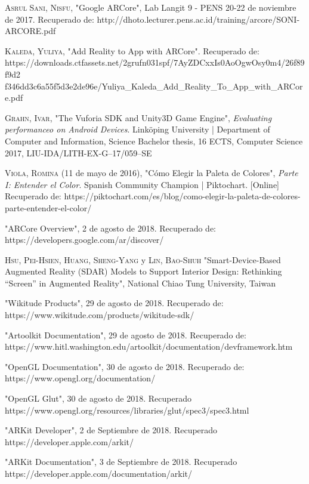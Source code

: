\begin{thebibliography}{X}
	 \textsc{Asrul Sani, Nisfu}, "Google ARCore", Lab Langit 9 - PENS 20-22 de noviembre de 2017. Recuperado de: http://dhoto.lecturer.pens.ac.id/training/arcore/SONI-ARCORE.pdf
	
	 \textsc{Kaleda, Yuliya}, "Add Reality to App with ARCore". Recuperado de: https://downloads.ctfassets.net/2grufn031spf/7AyZDCxxIs0AoOgwOsy0m4/26f89f9d2
	f346dd3c6a55f5d3e2de96e/Yuliya\_Kaleda\_Add\_Reality\_To\_App\_with\_ARCore.pdf
	
	 \textsc{Grahn, Ivar}, "The Vuforia SDK and Unity3D Game Engine", \textit{Evaluating performanceo on Android Devices}. Linköping University | Department of Computer and Information, Science Bachelor thesis, 16 ECTS, Computer Science 2017, LIU-IDA/LITH-EX-G–17/059–SE
	
	 \textsc{Viola, Romina} (11 de mayo de 2016), "Cómo Elegir la Paleta de Colores", \textit{Parte I: Entender el Color}. Spanish Community Champion | Piktochart. [Online] Recuperado de: https://piktochart.com/es/blog/como-elegir-la-paleta-de-colores-parte-entender-el-color/
	
	 "ARCore Overview", 2 de agosto de 2018. Recuperado de: https://developers.google.com/ar/discover/
	
	 \textsc{Hsu, Pei-Hsien}, \textsc{Huang, Sheng-Yang} y \textsc{Lin, Bao-Shuh} "Smart-Device-Based Augmented Reality (SDAR) Models to Support Interior Design: Rethinking “Screen” in Augmented Reality", National Chiao Tung University, Taiwan
	
	 "Wikitude Products", 29 de agosto de 2018. Recuperado de: https://www.wikitude.com/products/wikitude-sdk/
	
	 "Artoolkit Documentation", 29 de agosto de 2018. Recuperado de:
	https://www.hitl.washington.edu/artoolkit/documentation/devframework.htm
	
	
	 "OpenGL Documentation", 30 de agosto de 2018. Recuperado de:
	https://www.opengl.org/documentation/
	
	 "OpenGL Glut", 30 de agosto de 2018. Recuperado
	https://www.opengl.org/resources/libraries/glut/spec3/spec3.html
	
	 "ARKit Developer", 2 de Septiembre de 2018. Recuperado
	https://developer.apple.com/arkit/
	
	 "ARKit Documentation", 3 de Septiembre de 2018. Recuperado
    https://developer.apple.com/documentation/arkit/
    

\end{thebibliography}
